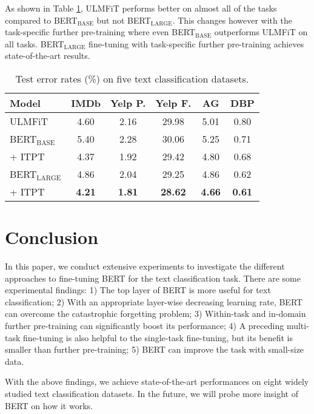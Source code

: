 \documentclass[11pt,a4paper]{article}
\theoremstyle{definition}
\begin{document}
\begin{CJK*}{UTF8}{gbsn}
As shown in Table \ref{tb:comparison_large}, ULMFiT performs better on almost all of the tasks compared to BERT$_\mathrm{BASE}$ but not BERT$_\mathrm{LARGE}$. This changes however with the task-specific further pre-training where even BERT$_\mathrm{BASE}$ outperforms ULMFiT on all tasks. BERT$_\mathrm{LARGE}$ fine-tuning with task-specific further pre-training achieves state-of-the-art results.

\begin{table}[h]\small\setlength{\tabcolsep}{5pt}
		\centering
		\begin{tabular}{l | c c c c c}
			\toprule
			Model & IMDb & Yelp P. & Yelp F. & AG & DBP  \\
			\midrule
			ULMFiT & 4.60 & 2.16 & 29.98 & 5.01 & 0.80 \\
			\midrule
			BERT$_\mathrm{BASE}$ & 5.40 & 2.28 & 30.06 & 5.25 & 0.71 \\
			\qquad + ITPT & 4.37 & 1.92 & 29.42 & 4.80 & 0.68 \\
			BERT$_\mathrm{LARGE}$ & 4.86 & 2.04 & 29.25 & 4.86 & 0.62  \\
			\qquad + ITPT & \textbf{4.21} & \textbf{1.81} & \textbf{28.62} & \textbf{4.66} & \textbf{0.61} \\
			\bottomrule
		\end{tabular}
		\caption{\label{tb:comparison_large} Test error rates (\%) on five text classification datasets.
		}
\end{table}

	

\section{Conclusion}

In this paper, we conduct extensive experiments to investigate the different approaches to fine-tuning BERT for the text classification task. There are some experimental findings: 1) The top layer of BERT is more useful for text classification; 2) With an appropriate layer-wise decreasing learning rate, BERT can overcome the catastrophic forgetting problem; 3) Within-task and in-domain further pre-training can significantly boost its performance; 4) A preceding multi-task fine-tuning is also helpful to the single-task fine-tuning, but its benefit is smaller than further pre-training; 5) BERT can improve the task with small-size data.

With the above findings, we achieve state-of-the-art performances on eight widely studied text classification datasets. In the future, we will probe more insight of BERT on how it works.




	
	\end{CJK*}
\end{document}
